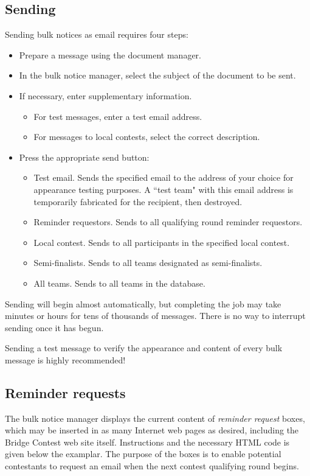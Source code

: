 \documentclass[11pt,letterpaper]{refart}
\def\ui#1{\textsf{#1}}
\begin{document}
\subsection{Sending}
Sending bulk notices as email requires four steps:
\begin{itemize}
\item Prepare a message using the document manager.
\item In the bulk notice manager, select the subject of the document to be sent.
\item If necessary, enter supplementary information. 
  \begin{itemize}
  \item For test messages, enter a test email address.
  \item For messages to local contests, select the correct description.
  \end{itemize}
\item Press the appropriate send button:   
  \begin{itemize}
  \item \ui{Test email}. Sends the specified email to the address of your choice
    for appearance testing purposes. A ``test team" with this email address
    is temporarily fabricated for the recipient, then destroyed.
  \item \ui{Reminder requestors}. Sends to all qualifying round reminder requestors.
  \item \ui{Local contest}. Sends to all participants in the specified local contest.
  \item \ui{Semi-finalists}. Sends to all teams designated as semi-finalists.
  \item \ui{All teams}. Sends to all teams in the database.
  \end{itemize}
\end{itemize}
Sending will begin almost automatically, but completing the job may take minutes
or hours for tens of thousands of messages. There is no way to interrupt sending
once it has begun.

Sending a test message to verify the appearance and content of every bulk message
is highly recommended!

\subsection{Reminder requests}
The bulk notice manager displays the current content of  
\emph{reminder request} boxes, which may be inserted in as many
Internet web pages as desired,
including the Bridge Contest web site itself.
Instructions and the necessary HTML code is given below the examplar. The
purpose of the boxes is to enable potential contestants to request an email when
the next contest qualifying round begins.
\end{document}
